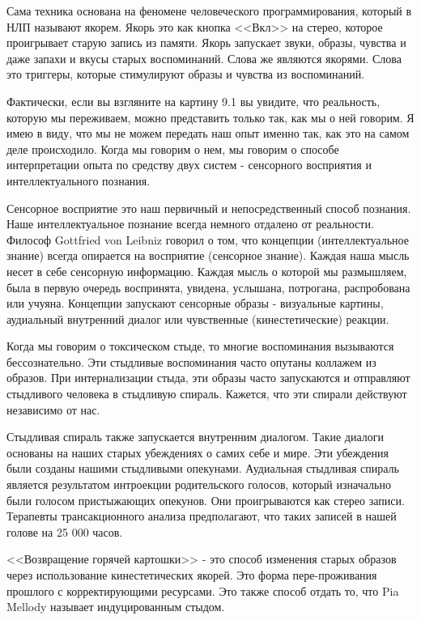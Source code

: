 \documentclass[10pt, fleqn]{article}
\begin{document}
Сама техника основана на феномене человеческого программирования, который в НЛП называют якорем. Якорь это как кнопка <<Вкл>> на стерео, которое проигрывает старую запись из памяти. Якорь запускает звуки, образы, чувства и даже запахи и вкусы старых воспоминаний. Слова же являются якорями. Слова это триггеры, которые стимулируют образы и чувства из воспоминаний.

Фактически, если вы взгляните на картину 9.1 вы увидите, что реальность, которую мы переживаем, можно представить только так, как мы о ней говорим. Я имею в виду, что мы не можем передать наш опыт именно так, как это на самом деле происходило. Когда мы говорим о нем, мы говорим о способе интерпретации опыта по средству двух систем - сенсорного восприятия и интеллектуального познания.

Сенсорное восприятие это наш первичный и непосредственный способ познания. Наше интеллектуальное познание всегда немного отдалено от реальности. Философ Gottfried von Leibniz говорил о том, что концепции (интеллектуальное знание) всегда опирается на восприятие (сенсорное знание). Каждая наша мысль несет в себе сенсорную информацию. Каждая мысль о которой мы размышляем, была в первую очередь воспринята, увидена, услышана, потрогана, распробована или учуяна. Концепции запускают сенсорные образы - визуальные картины, аудиальный внутренний диалог или чувственные (кинестетические) реакции.

Когда мы говорим о токсическом стыде, то многие воспоминания вызываются бессознательно. Эти стыдливые воспоминания часто опутаны коллажем из образов. При интернализации стыда, эти образы часто запускаются и отправляют стыдливого человека в стыдливую спираль. Кажется, что эти спирали действуют независимо от нас.

Стыдливая спираль также запускается внутренним диалогом. Такие диалоги основаны на наших старых убеждениях о самих себе и мире. Эти убеждения были созданы нашими стыдливыми опекунами. Аудиальная стыдливая спираль является результатом интроекции родительского голосов, который изначально были голосом пристыжающих опекунов. Они проигрываются как стерео записи. Терапевты трансакционного анализа предполагают, что таких записей в нашей голове на 25 000 часов.

<<Возвращение горячей картошки>> - это способ изменения старых образов через использование кинестетических якорей. Это форма пере-проживания прошлого с корректирующими ресурсами. Это также способ отдать то, что Pia Mellody называет индуцированным стыдом.
\end{document}
